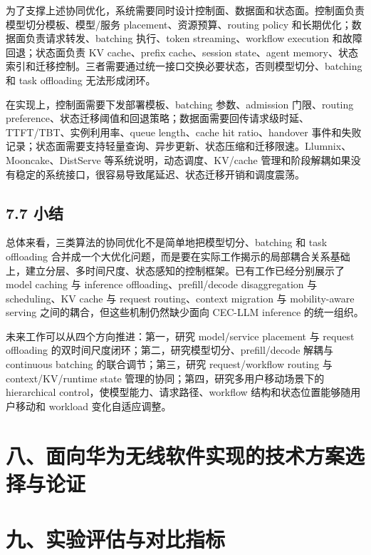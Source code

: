 \documentclass[a4paper,10pt]{ctexart}
\begin{document}
为了支撑上述协同优化，系统需要同时设计控制面、数据面和状态面。控制面负责模型切分模板、模型/服务 placement、资源预算、routing policy 和长期优化；数据面负责请求转发、batching 执行、token streaming、workflow execution 和故障回退；状态面负责 KV cache、prefix cache、session state、agent memory、状态索引和迁移控制。三者需要通过统一接口交换必要状态，否则模型切分、batching 和 task offloading 无法形成闭环。


在实现上，控制面需要下发部署模板、batching 参数、admission 门限、routing preference、状态迁移阈值和回退策略；数据面需要回传请求级时延、TTFT/TBT、实例利用率、queue length、cache hit ratio、handover 事件和失败记录；状态面需要支持轻量查询、异步更新、状态压缩和迁移限速。Llumnix、Mooncake、DistServe 等系统说明，动态调度、KV/cache 管理和阶段解耦如果没有稳定的系统接口，很容易导致尾延迟、状态迁移开销和调度震荡。


\subsection*{7.7 小结}

总体来看，三类算法的协同优化不是简单地把模型切分、batching 和 task offloading 合并成一个大优化问题，而是要在实际工作揭示的局部耦合关系基础上，建立分层、多时间尺度、状态感知的控制框架。已有工作已经分别展示了 model caching 与 inference offloading、prefill/decode disaggregation 与 scheduling、KV cache 与 request routing、context migration 与 mobility-aware serving 之间的耦合，但这些机制仍然缺少面向 CEC-LLM inference 的统一组织。


未来工作可以从四个方向推进：第一，研究 model/service placement 与 request offloading 的双时间尺度闭环；第二，研究模型切分、prefill/decode 解耦与 continuous batching 的联合调节；第三，研究 request/workflow routing 与 context/KV/runtime state 管理的协同；第四，研究多用户移动场景下的 hierarchical control，使模型能力、请求路径、workflow 结构和状态位置能够随用户移动和 workload 变化自适应调整。


\section*{八、面向华为无线软件实现的技术方案选择与论证}

\section*{九、实验评估与对比指标}
\end{document}
